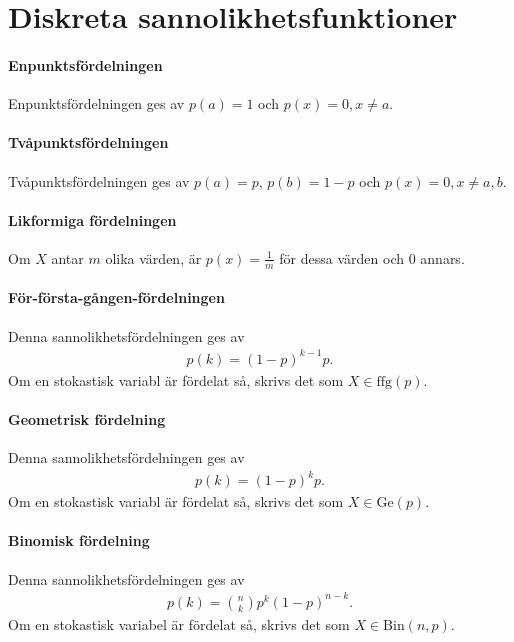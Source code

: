 \section{Diskreta sannolikhetsfunktioner}

\paragraph{Enpunktsfördelningen}
Enpunktsfördelningen ges av $p(a) = 1$ och $p(x) = 0, x\neq a$.

\paragraph{Tvåpunktsfördelningen}
Tvåpunktsfördelningen ges av $p(a) = p$, $p(b) = 1 - p$ och $p(x) = 0, x\neq a, b$.

\paragraph{Likformiga fördelningen}
Om $X$ antar $m$ olika värden, är $p(x) = \frac{1}{m}$ för dessa värden och $0$ annars.

\paragraph{För-första-gången-fördelningen}
Denna sannolikhetsfördelningen ges av
\begin{align*}
	p(k) = (1 - p)^{k - 1}p.
\end{align*}
Om en stokastisk variabl är fördelat så, skrivs det som $X\in\text{ffg}(p)$.

\paragraph{Geometrisk fördelning}
Denna sannolikhetsfördelningen ges av
\begin{align*}
	p(k) = (1 - p)^{k}p.
\end{align*}
Om en stokastisk variabl är fördelat så, skrivs det som $X\in\text{Ge}(p)$.

\paragraph{Binomisk fördelning}
Denna sannolikhetsfördelningen ges av
\begin{align*}
	p(k) = \binom{n}{k}p^{k}(1 - p)^{n - k}.
\end{align*}
Om en stokastisk variabel är fördelat så, skrivs det som $X\in\text{Bin}(n, p)$.

